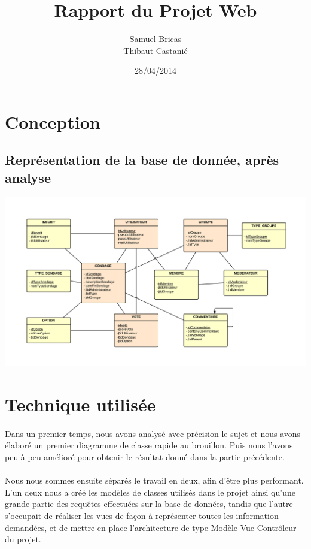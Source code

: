 \documentclass[a4paper,11pt]{article}
\begin{document}
\title{Rapport du Projet Web}
\author{Samuel Bricas\\Thibaut Castanié}
\date{28/04/2014}


\maketitle
\vspace{4em}
\tableofcontents

\maketitle

\newpage
\section{Conception}
\subsection{Représentation de la base de donnée, après analyse}
\includegraphics[scale=0.18, angle=90]{BddProjetWeb.png}
\section{Technique utilisée}
\paragraph{}
Dans un premier temps, nous avons analysé avec précision le sujet et nous avons élaboré un premier diagramme de classe rapide au brouillon. Puis nous l'avons peu à peu amélioré pour obtenir le résultat donné dans la partie précédente.
\paragraph{}Nous nous sommes ensuite séparés le travail en deux, afin d'être plus performant. L'un deux nous a créé les modèles de classes utilisés dans le projet ainsi qu'une grande partie des requêtes effectuées sur la base de données, tandis que l'autre s'occupait de réaliser les vues de façon à représenter toutes les information demandées, et de mettre en place l'architecture de type Modèle-Vue-Contrôleur du projet.
\end{document}
